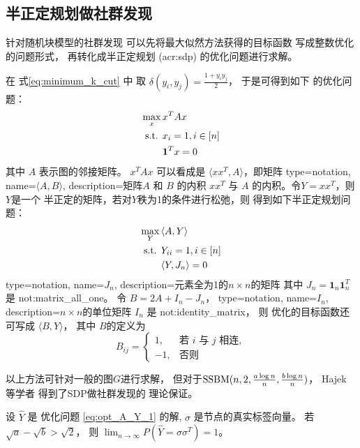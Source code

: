 \subsection{半正定规划做社群发现}
针对随机块模型的社群发现
可以先将最大似然方法获得的目标函数
写成整数优化的问题形式，
再转化成半正定规划 (\gls{acr:sdp}) 的优化问题进行求解。

在 式\eqref{eq:minimum_k_cut} 中
取 $\delta(y_i, y_j) = \frac{1+y_iy_j}{2}$，
于是可得到如下
的优化问题：
\begin{align}
  \max_x\, &  x^T A x \notag \\
  \textrm{s.t. } & x_{i} = 1, i \in [n] \notag \\
  & \mathbf{1}^T x = 0
\end{align}
其中 $A$ 表示图的邻接矩阵。
$ x^T A x $ 可以看成是 $\langle xx^T, A \rangle $，即矩阵
{
  type=notation,
  name={$\langle A, B \rangle $},
  description={矩阵$A$ 和 $B$ 的内积}
}
$xx^T$ 与 $A$ 的内积。令$Y=xx^T$，则$Y$是一个
半正定的矩阵，若对$Y$秩为1的条件进行松弛，则
得到如下半正定规划问题：
\begin{align}\label{eq:opt_A_Y_1}
  \max_Y\, & \langle A, Y \rangle  \notag \\
  \textrm{s.t. } & Y_{ii} = 1, i \in [n] \notag \\
  & \langle Y, J_n \rangle  = 0
\end{align}
{
  type=notation,
  name={$J_n$},
  description={元素全为1的$n\times n$的矩阵}
}
其中 $J_n=\mathbf{1}_n\mathbf{1}_n^T$
是 \glsdesc{not:matrix_all_one}。
令 $B=2A + I_n - J_n$，
{
  type=notation,
  name={$I_n$},
  description={$n\times n$的单位矩阵}
}
$I_n$ 是 \glsdesc{not:identity_matrix}，
则
优化的目标函数还可写成 $ \langle B, Y \rangle $，
其中 $B$的定义为
\begin{equation}\label{eq:def_B_sdp}
    B_{ij} = \begin{cases}
        1, & \text{若 $i$ 与 $j$ 相连}, \\
        -1,& \text{否则}
    \end{cases}
\end{equation}  

以上方法可针对一般的图$G$进行求解，
但对于$\operatorname{SSBM}(n,2, \frac{a \log n}{n}, \frac{b \log n}{n})$，
Hajek 等学者 \cite{hajek2016achieving} 得到了SDP做社群发现的
理论保证。
\begin{theorem}
  设 $\hat{Y}$ 是
  优化问题 \eqref{eq:opt_A_Y_1} 的解, $\sigma$ 是节点的真实标签向量。
  若 $\sqrt{a} - \sqrt{b}
  > \sqrt{2}$，
  则
  $\lim_{n\to\infty} P(\hat{Y}=\sigma\sigma^T)=1$。
\end{theorem}
